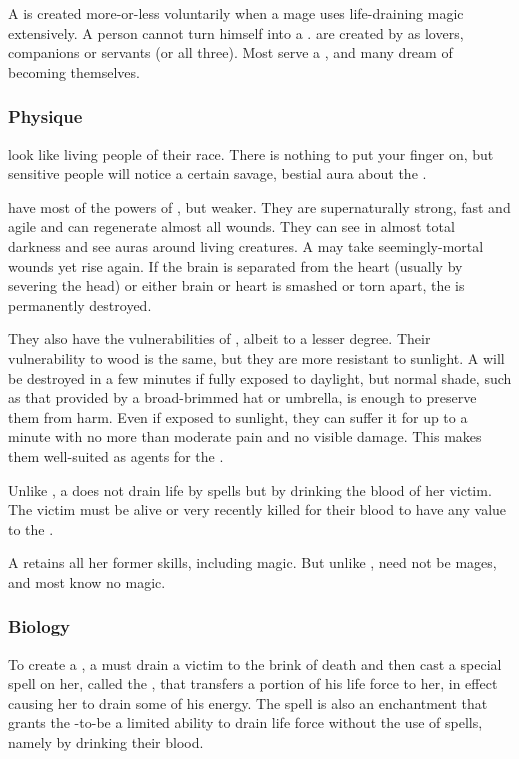 A \Reaver{} is created more-or-less voluntarily when a mage uses life-draining magic extensively. A person cannot turn himself into a \Leech{}. \Leeches{} are created by \Reavers{} as lovers, companions or servants (or all three). Most \Leeches{} serve a \Reaver, and many dream of becoming \Reavers{} themselves. 

\subsubsection{Physique}
\Leeches{} look like living people of their race. There is nothing to put your finger on, but sensitive people will notice a certain savage, bestial aura about the \Leech. 

\Leeches{} have most of the powers of \Reavers{}, but weaker. They are supernaturally strong, fast and agile and can regenerate almost all wounds. They can see in almost total darkness and see auras around living creatures. A \Leech{} may take seemingly-mortal wounds yet rise again. If the brain is separated from the heart (usually by severing the head) or either brain or heart is smashed or torn apart, the \Leech{} is permanently destroyed. 

They also have the vulnerabilities of \Reavers{}, albeit to a lesser degree. Their vulnerability to wood is the same, but they are more resistant to sunlight. A \Leech{} will be destroyed in a few minutes if fully exposed to daylight, but normal shade, such as that provided by a broad-brimmed hat or umbrella, is enough to preserve them from harm. Even if exposed to sunlight, they can suffer it for up to a minute with no more than moderate pain and no visible damage. This makes them well-suited as agents for the \Reavers.

Unlike \Reavers, a \Leech{} does not drain life by spells but by drinking the blood of her victim. The victim must be alive or very recently killed for their blood to have any value to the \Leech. 

A \Leech{} retains all her former skills, including magic. But unlike \Reavers, \Leeches{} need not be mages, and most know no magic. 

\subsubsection{Biology}
To create a \Leech, a \Reaver{} must drain a victim to the brink of death and then cast a special spell on her, called the , that transfers a portion of his life force to her, in effect causing her to drain some of his energy. The spell is also an enchantment that grants the \Leech-to-be a limited ability to drain life force without the use of spells, namely by drinking their blood. 

